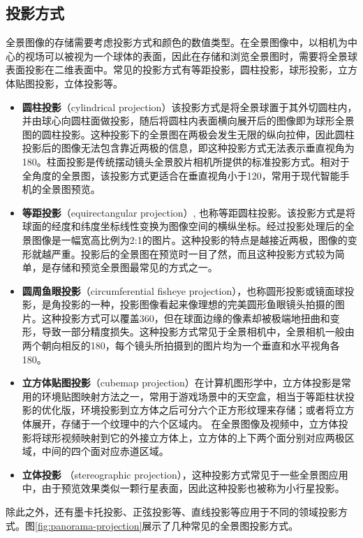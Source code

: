\subsection{投影方式}
全景图像的存储需要考虑投影方式和颜色的数值类型。在全景图像中，以相机为中心的视场可以被视为一个球体的表面，因此在存储和浏览全景图时，需要将全景球表面投影在二维表面中。常见的投影方式有等距投影，圆柱投影，球形投影，立方体贴图投影，立体投影等。
\begin{itemize}
\item \textbf{圆柱投影}（cylindrical projection）该投影方式是将全景球置于其外切圆柱内，并由球心向圆柱面做投影，随后将圆柱内表面横向展开后的图像即为球形全景图的圆柱投影。这种投影下的全景图在两极会发生无限的纵向拉伸，因此圆柱投影后的图像无法包含靠近两极的信息，即这种投影方式无法表示垂直视角为180。柱面投影是传统摆动镜头全景胶片相机所提供的标准投影方式。相对于全角度的全景图，该投影方式更适合在垂直视角小于120，常用于现代智能手机的全景图预览。
\item \textbf{等距投影}（equirectangular projection）, 也称等距圆柱投影。该投影方式是将球面的经度和纬度坐标线性变换为图像空间的横纵坐标。经过投影处理后的全景图像是一幅宽高比例为2:1的图片。这种投影的特点是越接近两极，图像的变形就越严重。投影后的全景图在预览时一目了然，而且这种投影方式较为简单，是存储和预览全景图最常见的方式之一。
\item \textbf{圆周鱼眼投影}（circumferential fisheye projection），也称圆形投影或镜面球投影，是角投影的一种，投影图像看起来像理想的完美圆形鱼眼镜头拍摄的图片。这种投影方式可以覆盖360，但在球面边缘的像素却被极端地扭曲和变形，导致一部分精度损失。这种投影方式常见于全景相机中，全景相机一般由两个朝向相反的180，每个镜头所拍摄到的图片均为一个垂直和水平视角各180。
\item \textbf{立方体贴图投影}（cubemap projection）在计算机图形学中，立方体投影是常用的环境贴图映射方法之一，常用于游戏场景中的天空盒，相当于等距柱状投影的优化版，环境投影到立方体之后可分六个正方形纹理来存储；或者将立方体展开，存储于一个纹理中的六个区域内。 
在全景图像及视频中，立方体投影将球形视频映射到它的外接立方体上，立方体的上下两个面分别对应两极区域，中间的四个面对应赤道区域。
\item \textbf{立体投影} （stereographic projection），这种投影方式常见于一些全景图应用中，由于预览效果类似一颗行星表面，因此这种投影也被称为小行星投影。
\end{itemize}

除此之外，还有墨卡托投影、正弦投影等、直线投影等应用于不同的领域投影方式。图\ref{fig:panorama-projection}展示了几种常见的全景图投影方式。


